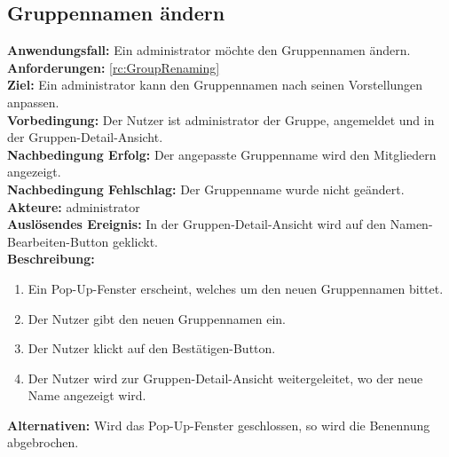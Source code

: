 \documentclass[parskip=full]{scrartcl}
\begin{document}
\subsection{Gruppennamen ändern}
\textbf{Anwendungsfall:} Ein \gls{administrator} möchte den Gruppennamen ändern.\\
\textbf{Anforderungen:} \ref{rc:GroupRenaming}\\
\textbf{Ziel:} Ein \gls{administrator} kann den Gruppennamen nach seinen Vorstellungen anpassen.\\
\textbf{Vorbedingung:} Der Nutzer ist \gls{administrator} der Gruppe, angemeldet und in der Gruppen-Detail-Ansicht.\\
\textbf{Nachbedingung Erfolg:} Der angepasste Gruppenname wird den Mitgliedern angezeigt.\\
\textbf{Nachbedingung Fehlschlag:} Der Gruppenname wurde nicht geändert.\\
\textbf{Akteure:} \gls{administrator}\\
\textbf{Auslösendes Ereignis:} In der Gruppen-Detail-Ansicht wird auf den Namen-Bearbeiten-Button geklickt.\\
\textbf{Beschreibung:}
\begin{enumerate}
    \item Ein Pop-Up-Fenster erscheint, welches um den neuen Gruppennamen bittet.
    \item Der Nutzer gibt den neuen Gruppennamen ein.
    \item Der Nutzer klickt auf den Bestätigen-Button.
    \item Der Nutzer wird zur Gruppen-Detail-Ansicht weitergeleitet, wo der neue Name angezeigt wird.
\end{enumerate}
\textbf{Alternativen:} Wird das Pop-Up-Fenster geschlossen, so wird die Benennung abgebrochen.
\newpage
\end{document}
